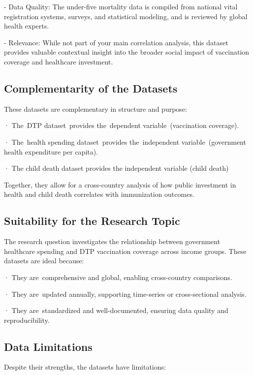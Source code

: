 \documentclass[
]{article}
\begin{document}
- Data Quality: The under-five mortality data is compiled from national
vital registration systems, surveys, and statistical modeling, and is
reviewed by global health experts.

- Relevance: While not part of your main correlation analysis, this
dataset provides valuable contextual insight into the broader social
impact of vaccination coverage and healthcare investment.

\subsection{Complementarity of the
Datasets}\label{complementarity-of-the-datasets}

These datasets are complementary in structure and purpose:

· The~DTP dataset~provides the~dependent variable~(vaccination
coverage).

· The~health spending dataset~provides the~independent
variable~(government health expenditure per capita).

· The child death dataset provides the independent variable (child
death)

Together, they allow for a cross-country analysis of how public
investment in health and child death correlates with immunization
outcomes.

\subsection{Suitability for the Research
Topic}\label{suitability-for-the-research-topic}

The research question investigates the relationship between government
healthcare spending and DTP vaccination coverage across income groups.
These datasets are ideal because:

· They are~comprehensive and global, enabling cross-country comparisons.

· They are~updated annually, supporting time-series or cross-sectional
analysis.

· They are~standardized and well-documented, ensuring data quality and
reproducibility.

\subsection{Data Limitations}\label{data-limitations}

Despite their strengths, the datasets have limitations:
\end{document}
